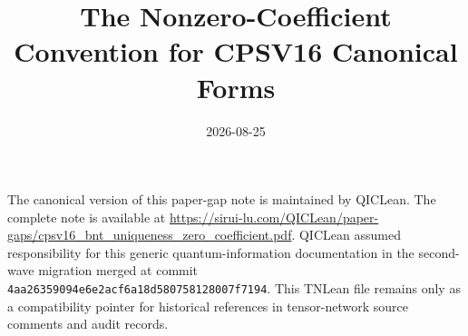 \documentclass{article}
\title{The Nonzero-Coefficient Convention for CPSV16 Canonical Forms}
\author{}
\date{2026-08-25}
\begin{document}
\maketitle
{}

The canonical version of this paper-gap note is maintained by QICLean. The
complete note is available at
\url{https://sirui-lu.com/QICLean/paper-gaps/cpsv16_bnt_uniqueness_zero_coefficient.pdf}.
QICLean assumed responsibility for this generic quantum-information
documentation in the second-wave migration merged at commit
\texttt{4aa26359094e6e2acf6a18d580758128007f7194}. This TNLean file remains
only as a compatibility pointer for historical references in tensor-network
source comments and audit records.
\end{document}

